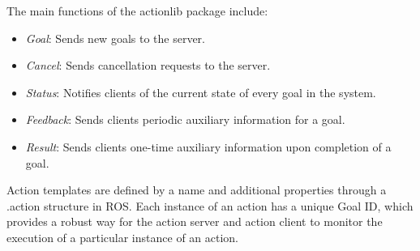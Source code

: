 The main functions of the actionlib package include:
\begin{itemize}
    \item \textit{Goal}: Sends new goals to the server.
    \item \textit{Cancel}: Sends cancellation requests to the server.
    \item \textit{Status}: Notifies clients of the current state of every goal in the system.
    \item \textit{Feedback}: Sends clients periodic auxiliary information for a goal.
    \item \textit{Result}: Sends clients one-time auxiliary information upon completion of a goal.
\end{itemize}
Action templates are defined by a name and additional properties through a .action structure in ROS. 
Each instance of an action has a unique Goal ID, which provides a robust way for the action server and action client to monitor the execution of a particular instance of an action.